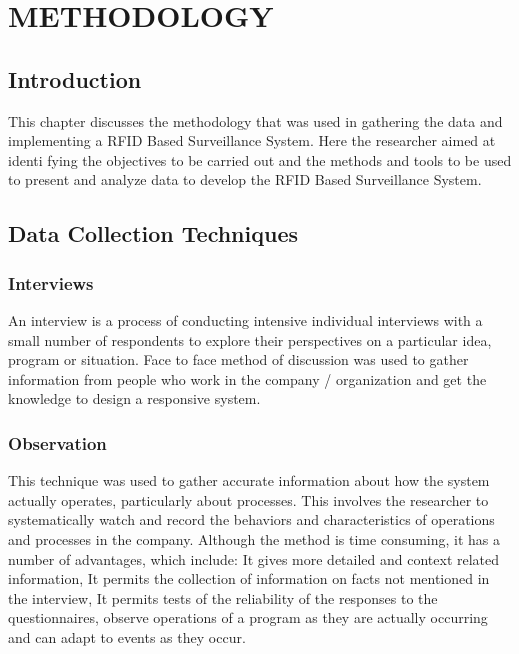 
\normalsize\chapter{METHODOLOGY}

\section{Introduction}
\par This chapter discusses the methodology that was used in gathering the data and
implementing a RFID Based Surveillance System. Here the researcher aimed at identi
fying the objectives to be carried out and the methods and tools to be used to
present and analyze data to develop the RFID Based Surveillance System.\\
\section{Data Collection Techniques}

\subsection{Interviews}
An interview is a process of conducting intensive individual interviews with a small
number of respondents to explore their perspectives on a particular idea, program
or situation. Face to face method of discussion was used to gather information
from people who work in the company / organization and get the knowledge to
design a responsive system.
\subsection{Observation}
This technique was used to gather accurate information about how the system
actually operates, particularly about processes. This involves the researcher to
systematically watch and record the behaviors and characteristics of operations
and processes in the company. Although the method is time consuming, it has a
number of advantages, which include: It gives more detailed and context related
information, It permits the collection of information on facts not mentioned in the
interview, It permits tests of the reliability of the responses to the questionnaires,
observe operations of a program as they are actually occurring and can adapt to
events as they occur.
